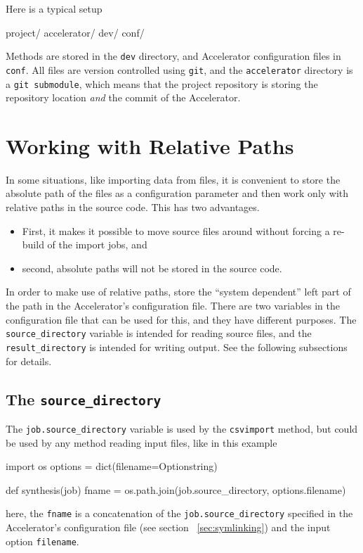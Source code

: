 Here is a typical setup
\begin{shell}
project/
    accelerator/
    dev/
    conf/
\end{shell}
Methods are stored in the \texttt{dev} directory, and Accelerator
configuration files in \texttt{conf}.  All files are version
controlled using \texttt{git}, and the \texttt{accelerator} directory
is a \texttt{git submodule}, which means that the project repository
is storing the repository location \textsl{and} the commit of the
Accelerator.





\section{Working with Relative Paths}

In some situations, like importing data from files, it is convenient
to store the absolute path of the files as a configuration parameter
and then work only with relative paths in the source code.  This has
two advantages.
\begin{itemize}
\item[] First, it makes it possible to move source files around without
forcing a re-build of the import jobs, and
\item[] second, absolute paths will not be stored in the source code.
\end{itemize}
In order to make use of relative paths, store the ``system dependent''
left part of the path in the Accelerator's configuration file.  There
are two variables in the configuration file that can be used for this,
and they have different purposes.  The \texttt{source\_directory}
variable is intended for reading source files, and
the \texttt{result\_directory} is intended for writing output.  See
the following subsections for details.


\subsection{The \texttt{source\_directory}}
\label{sec:SOURCE_DIR}

The \texttt{job.source\_directory} variable is used by the
\texttt{csvimport} method, but could be used by any method reading
input files, like in this example
\begin{python}
import os
options = dict(filename=Optionstring)

def synthesis(job)
    fname = os.path.join(job.source_directory, options.filename)
\end{python}
here, the \texttt{fname} is a concatenation of the
\texttt{job.source\_directory} specified in the Accelerator's
configuration file (see section ~\ref{sec:symlinking}) and the input
option \texttt{filename}.


